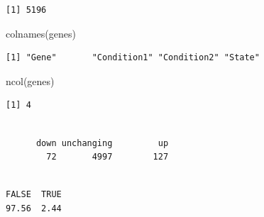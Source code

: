 \documentclass[
  letterpaper,
  DIV=11,
  numbers=noendperiod]{scrartcl}
\newenvironment{Shaded}{\begin{snugshade}}{\end{snugshade}}
\newcommand{\DecValTok}[1]{\textcolor[rgb]{0.68,0.00,0.00}{#1}}
\newcommand{\FunctionTok}[1]{\textcolor[rgb]{0.28,0.35,0.67}{#1}}
\newcommand{\NormalTok}[1]{\textcolor[rgb]{0.00,0.23,0.31}{#1}}
\newcommand{\OtherTok}[1]{\textcolor[rgb]{0.00,0.23,0.31}{#1}}
\newcommand{\SpecialCharTok}[1]{\textcolor[rgb]{0.37,0.37,0.37}{#1}}
\newcommand{\StringTok}[1]{\textcolor[rgb]{0.13,0.47,0.30}{#1}}
\begin{document}
\begin{verbatim}
[1] 5196
\end{verbatim}

\begin{Shaded}
\begin{Highlighting}[]
\FunctionTok{colnames}\NormalTok{(genes)}
\end{Highlighting}
\end{Shaded}

\begin{verbatim}
[1] "Gene"       "Condition1" "Condition2" "State"     
\end{verbatim}

\begin{Shaded}
\begin{Highlighting}[]
\FunctionTok{ncol}\NormalTok{(genes)}
\end{Highlighting}
\end{Shaded}

\begin{verbatim}
[1] 4
\end{verbatim}

\begin{Shaded}
\end{Shaded}

\begin{verbatim}

      down unchanging         up 
        72       4997        127 
\end{verbatim}

\begin{Shaded}
\end{Shaded}

\begin{verbatim}

FALSE  TRUE 
97.56  2.44 
\end{verbatim}

\begin{Shaded}
\end{Shaded}
\end{document}
